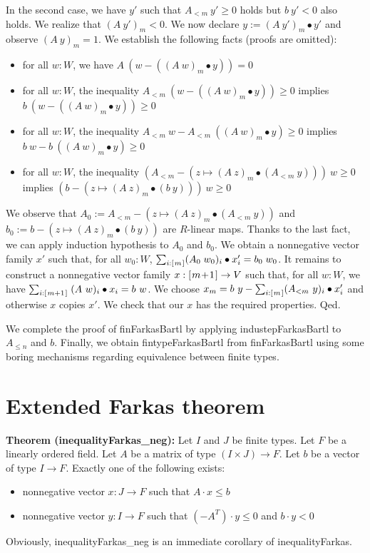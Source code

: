 \documentclass[]{article}
\renewcommand{\.}{\hskip .75pt}
\newcommand{\fin}[1]{[\.#1\.]}
\let\r=\rightarrow
\let\*=\cdot
\begin{document}
In the second case, we have $y'$ such that $A_{<m}~y' \ge 0$
holds but $b~y' < 0$ also holds. We realize that $(A~y')_m < 0$.
We now declare $y := (A~y')_m \bullet y'$ and observe
$(A~y)_m = 1$. We establish the following facts (proofs are omitted):
\begin{itemize}
\item for all $w : W$, we have $A~(w - ((A~w)_m \bullet y)) = 0$
\item for all $w : W$, the inequality $A_{<m}~(w - ((A~w)_m \bullet y)) \ge 0$
implies $b~(w - ((A~w)_m \bullet y)) \ge 0$
\item for all $w : W$, the inequality $A_{<m}~w - A_{<m}~((A~w)_m \bullet y) \ge 0$
implies $b~w - b~((A~w)_m \bullet y) \ge 0$
\item for all $w : W$, the inequality $(A_{<m} - (z \mapsto (A~z)_m \bullet (A_{<m}~y)))~w \ge 0$
implies $(b - (z \mapsto (A~z)_m \bullet (b~y)))~w \ge 0$
\end{itemize}
We observe that
$A_0 := A_{<m} - (z \mapsto (A~z)_m \bullet (A_{<m}~y))$
and
$b_0 := b - (z \mapsto (A~z)_m \bullet (b~y))$
are $R$-linear maps.
Thanks to the last fact, we can apply induction hypothesis to $A_0$ and $b_0$.
We obtain a nonnegative vector family $x'$ such that,
for all $w_0 : W$, $ \sum_{i : \fin{m}} (A_0\;w_0)_i \bullet x'_i = b_0\;w_0 $.
It remains to construct a nonnegative vector family $x : \fin{m\!+\!1} \r V$
such that, for all $w : W$, we have
$ \sum_{i : \fin{m+1}}\; (A~w)_i \bullet x_i = b~w $.
We choose $x_m = b~y - \sum_{i : \fin{m}} (A_{<m}~y)_i \bullet x'_i$
and otherwise $x$ copies $x'$. We check that our $x$ has the required
properties. Qed.

\medskip
We complete the proof of finFarkasBartl by applying industepFarkasBartl
to $A_{\le n}$ and $b$. Finally, we obtain fintypeFarkasBartl from
finFarkasBartl using some boring mechanisms regarding equivalence between
finite types.


\section {Extended Farkas theorem}

\textbf{Theorem (inequalityFarkas\_neg):}
Let $I$ and $J$ be finite types.
Let $F$ be a linearly ordered field.
Let $A$ be a matrix of type $(I \times J) \r F$.
Let $b$ be a vector of type $I \r F$.
Exactly one of the following exists:
\begin{itemize}
	\item nonnegative vector $x : J \r F$ such that $A \* x \le b$
	\item nonnegative vector $y : I \r F$ such that $(-A^T) \* y \le 0$ and $b \* y < 0$
\end{itemize}
Obviously, inequalityFarkas\_neg is an immediate corollary of inequalityFarkas.
\end{document}
